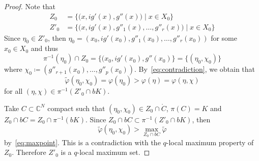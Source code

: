 \documentclass[reqno,oneside]{amsart}
\newcommand{\numberset}{\mathbb}
\newcommand{\C}{\numberset{C}}
\renewcommand{\phi}{\varphi}
\theoremstyle{definition}
\theoremstyle{plain}
\theoremstyle{remark}
\begin{document}
\begin{proof}
    Note that
    \begin{align*}
        Z_0 &= \bigl\{\bigl(x,ig'(x),g''(x)\bigr) \mid x\in X_0\bigr\} \\
        Z'_0 &= \bigl\{\bigl(x,ig'(x),g''_1(x),\dots,g''_r(x)\bigr) \mid x\in X_0\bigr\}
    \end{align*}
    Since $\eta_0\in Z'_0$, then $\eta_0=(x_0,ig'(x_0),g''_1(x_0),\dots,g''_r(x_0))$ for some $x_0\in X_0$ and thus
    \[
        \pi^{-1}(\eta_0)\cap Z_0=\{(x_0,ig'(x_0),g''(x_0)\}=\{(\eta_0,\chi_0)\}
    \]
    where $\chi_0\coloneqq(g''_{r+1}(x_0),\dots,g''_p(x_0))$. By~\eqref{eq:contradiction}, we obtain that
    \begin{equation}
    \label{eq:maxpoint}
        \tilde\phi(\eta_0,\chi_0)=\phi(\eta_0)>\phi(\eta)=\phi(\eta,\chi)
    \end{equation}
    for all $(\eta,\chi)\in\pi^{-1}(Z'_0\cap bK)$.

    Take $C\subset\C^N$ compact such that $(\eta_0,\chi_0)\in Z_0\cap\mathring{C}$, $\pi(C)=K$ and $Z_0\cap bC= Z_0\cap\pi^{-1}(bK)$. Since $Z_0\cap bC\subset\pi^{-1}(Z'_0\cap bK)$, then
    \[
        \tilde\phi(\eta_0,\chi_0)>\max_{Z_0\cap bC}\tilde\phi
    \]
    by~\eqref{eq:maxpoint}. This is a contradiction with the $q$-local maximum property of $Z_0$. Therefore $Z'_0$ is a $q$-local maximum set.
\end{proof}
\end{document}
